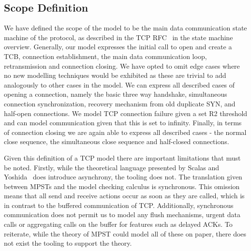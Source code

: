 \subsection{Scope Definition}

We have defined the scope of the model to be the main data communication state machine of the protocol, as described in the TCP RFC~\cite{rfc9293} in the state machine overview.
Generally, our model expresses the initial call to open and create a TCB, connection establishment, the main data communication loop, retransmission and connection closing.
We have opted to omit edge cases where no new modelling techniques would be exhibited as these are trivial to add analogously to other cases in the model.
We can express all described cases of opening a connection, namely the basic three way handshake, simultaneous connection synchronization, recovery mechanism from old duplicate SYN, and half-open connections.
We model TCP connection failure given a set R2 threshold and can model communication given that this is set to infinity.
Finally, in terms of connection closing we are again able to express all described cases - the normal close sequence, the simultaneous close sequence and half-closed connections.

Given this definition of a TCP model there are important limitations that must be noted.
Firstly, while the theoretical language presented by Scalas and Yoshida~\cite{SY19} does introduce asynchrony, the tooling does not.
The translation given between MPSTs and the model checking calculus is synchronous.
This omission means that all send and receive actions occur as soon as they are called, which is in contrast to the buffered communication of TCP.
Additionally, synchronous communication does not permit us to model any flush mechanisms, urgent data calls or aggregating calls on the buffer for features such as delayed ACKs.
To reiterate, while the theory of MPST could model all of these on paper, there does not exist the tooling to support the theory.

